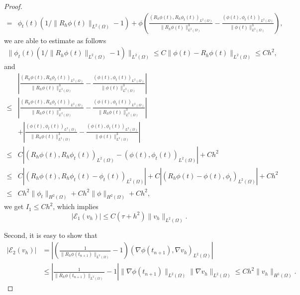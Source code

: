 \documentclass{siamart250211}
\def\nn{\nonumber}
\begin{document}
\begin{proof}
\begin{align*}
	 =& \phi_t(t) (1/\|R_h\phi(t)\|_{L^2(\Omega)} - 1) + \phi\left( \frac{(R_h\phi(t), R_h\phi_t(t))_{L^2(\Omega)}}{\|R_h\phi(t)\|_{L^2(\Omega)}^3} - \frac{(\phi(t), \phi_t(t))_{L^2(\Omega)}}{\|\phi(t)\|_{L^2(\Omega)}^3} \right),
\end{align*}
we are able to estimate as follows
\begin{align*}
    \| \phi_t(t) (1/\|R_h\phi(t)\|_{L^2(\Omega)} - 1)\|_{L^2(\Omega)} \le C \|\phi(t) - R_h\phi(t)\|_{L^2(\Omega)} \le C h^2,
\end{align*}
and
\begin{align*}
	& \left| \frac{(R_h\phi(t), R_h\phi_t(t))_{L^2(\Omega)}}{\|R_h\phi(t)\|_{L^2(\Omega)}^3} - \frac{(\phi(t), \phi_t(t))_{L^2(\Omega)}}{\|\phi(t)\|_{L^2(\Omega)}^3} \right| \\
	   \le & \left| \frac{(R_h\phi(t), R_h\phi_t(t))_{L^2(\Omega)}}{\|R_h\phi(t)\|_{L^2(\Omega)}^3} - \frac{(\phi(t), \phi_t(t))_{L^2(\Omega)}}{\|R_h\phi(t)\|_{L^2(\Omega)}^3} \right| \\
	    & + \left| \frac{(\phi(t), \phi_t(t))_{L^2(\Omega)}}{\|R_h\phi(t)\|_{L^2(\Omega)}^3} - \frac{(\phi(t), \phi_t(t))_{L^2(\Omega)}}{\|\phi(t)\|_{L^2(\Omega)}^3} \right| \\
	   \le & C \left| (R_h\phi(t), R_h\phi_t(t))_{L^2(\Omega)} -  (\phi(t), \phi_t(t))_{L^2(\Omega)} \right| + C h^2 \\
	   \le & C \left| (R_h\phi(t), R_h\phi_t(t) - \phi_t(t))_{L^2(\Omega)}  \right| + C \left| (R_h\phi(t) - \phi(t), \phi_t)_{L^2(\Omega)}  \right| +Ch^2 \\
	   \le & C h^2\|\phi_t\|_{H^2(\Omega)} + Ch^2 \|\phi\|_{H^2(\Omega)} + Ch^2,
\end{align*}
we get $I_1 \le C h^2$, which implies 
\begin{equation}
	|\mathcal{E}_1(v_h)| \le C (\tau + h^2)\|v_h\|_{L^2(\Omega)}.
\end{equation}

Second, it is easy to show that 
\begin{align}
 |\mathcal{E}_2(v_h)| &=\left| \left( \frac{1}{\|R_h\phi(t_{n+1})\|_{L^2(\Omega)}} - 1 \right)(\nabla \phi(t_{n+1}), \nabla v_h)_{L^2(\Omega)} \right| \nn \\
   & \le \left| \frac{1}{\|R_h\phi(t_{n+1})\|_{L^2(\Omega)}} - 1 \right|\|\nabla \phi(t_{n+1})\|_{L^2(\Omega)} \|\nabla v_h\|_{L^2(\Omega)} \le C h^2\|v_h\|_{H^1(\Omega)}.
\end{align} 


\end{proof}
\end{document}
